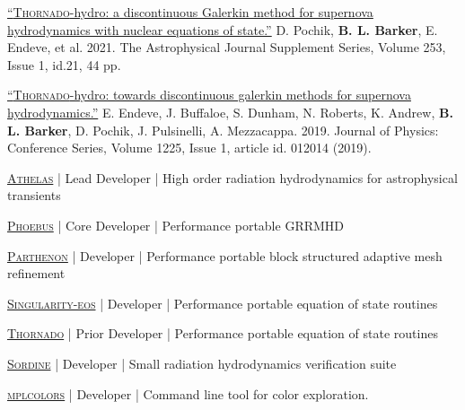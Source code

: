\documentclass[11pt]{vitae}
\begin{document}
\begin{publist}
\item \href{https://iopscience.iop.org/article/10.3847/1538-4365/abd700}{``\textsc{Thornado}-hydro: a discontinuous Galerkin method for supernova hydrodynamics with nuclear equations of state.''} D. Pochik, \textbf{B. L. Barker}, E. Endeve, et al. 2021. The Astrophysical Journal Supplement Series, Volume 253, Issue 1, id.21, 44 pp.

\item \href{https://doi.org/10.1088/1742-6596/1225/1/012014}{``\textsc{Thornado}-hydro: towards discontinuous galerkin methods for supernova hydrodynamics.''} E. Endeve, J. Buffaloe, S. Dunham, N. Roberts, K. Andrew, \textbf{B. L. Barker}, D. Pochik, J. Pulsinelli, A. Mezzacappa. 2019. Journal of Physics: Conference Series, Volume 1225, Issue 1, article id. 012014 (2019).

\end{publist}

\begin{genericlist}
        \item \href{https://github.com/astrobarker/athelas}{\textsc{Athelas}} | Lead Developer | 
  High order radiation hydrodynamics for astrophysical transients
\item \href{https://github.com/lanl/phoebus}{\textsc{Phoebus}} | Core Developer | 
  Performance portable GRRMHD
\item \href{https://github.com/parthenon-hpc-lab/parthenon}{\textsc{Parthenon}} | Developer | 
  Performance portable block structured adaptive mesh refinement
\item \href{https://github.com/lanl/singularity-eos}{\textsc{Singularity-eos}} | Developer | 
  Performance portable equation of state routines
\item \href{https://github.com/endeve/thornado}{\textsc{Thornado}} | Prior Developer | 
  Performance portable equation of state routines
\item \href{https://github.com/astrobarker/sordine}{\textsc{Sordine}} | Developer | 
  Small radiation hydrodynamics verification suite
\item \href{https://github.com/astrobarker/mplcolors}{\textsc{mplcolors}} | Developer | 
  Command line tool for color exploration.
\end{genericlist}
\end{document}
